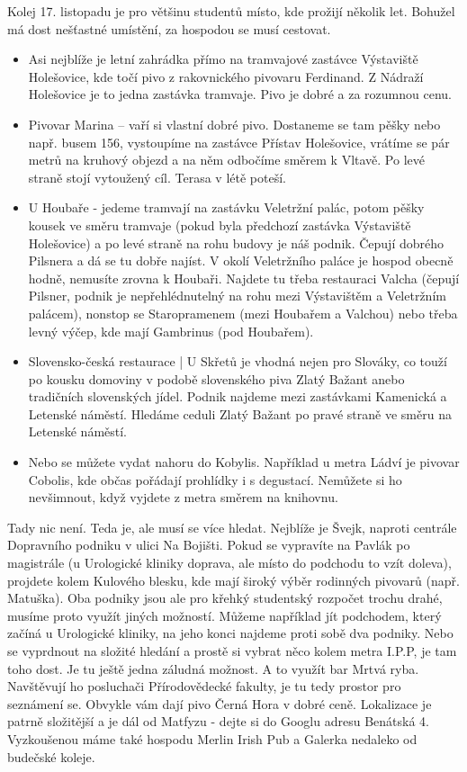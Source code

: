Kolej 17. listopadu je pro většinu studentů místo, kde prožijí několik let.
Bohužel má dost nešťastné umístění, za hospodou se musí cestovat.
\begin{itemize}
\item Asi nejblíže je letní zahrádka přímo na tramvajové zastávce Výstaviště
Holešovice, kde točí pivo z rakovnického pivovaru Ferdinand. Z Nádraží
Holešovice je to jedna zastávka tramvaje. Pivo je dobré a za rozumnou cenu.
\item Pivovar Marina – vaří si vlastní dobré pivo. Dostaneme se tam pěšky nebo
např. busem 156, vystoupíme na zastávce Přístav Holešovice, vrátíme se pár metrů
na kruhový objezd a na něm odbočíme směrem k Vltavě. Po levé straně stojí
vytoužený cíl. Terasa v létě poteší.
\item U Houbaře - jedeme tramvají na zastávku Veletržní palác, potom pěšky
kousek ve směru tramvaje (pokud byla předchozí zastávka Výstaviště Holešovice) a
po levé straně na rohu budovy je náš podnik. Čepují dobrého Pilsnera a dá se tu
dobře najíst. V okolí Veletržního paláce je hospod obecně hodně, nemusíte zrovna
k Houbaři. Najdete tu třeba restauraci Valcha (čepují Pilsner, podnik je
nepřehlédnutelný na rohu mezi Výstavištěm a Veletržním palácem), nonstop se
Staropramenem (mezi Houbařem a Valchou) nebo třeba levný výčep, kde mají
Gambrinus (pod Houbařem).
\item Slovensko-česká restaurace | U Skřetů je vhodná nejen pro Slováky, co
touží po kousku domoviny v podobě slovenského piva Zlatý Bažant anebo tradičních
slovenských jídel. Podnik najdeme mezi zastávkami Kamenická a Letenské náměstí.
Hledáme ceduli Zlatý Bažant po pravé straně ve směru na Letenské náměstí.
\item Nebo se můžete vydat nahoru do Kobylis. Například u metra Ládví je pivovar
Cobolis, kde občas pořádají prohlídky i s degustací. Nemůžete si ho nevšimnout,
když vyjdete z metra směrem na knihovnu.
\end{itemize}

Tady nic není. Teda je, ale musí se více hledat. Nejblíže je Švejk, naproti
centrále Dopravního podniku v ulici Na Bojišti. Pokud se vypravíte na Pavlák po
magistrále (u Urologické kliniky doprava, ale místo do podchodu to vzít doleva),
projdete kolem Kulového blesku, kde mají široký výběr rodinných pivovarů (např.
Matuška). Oba podniky jsou ale pro křehký studentský rozpočet trochu drahé,
musíme proto využít jiných možností. Můžeme například jít podchodem, který
začíná u Urologické kliniky, na jeho konci najdeme proti sobě dva podniky. Nebo
se vyprdnout na složité hledání a prostě si vybrat něco kolem metra I.P.P, je
tam toho dost. Je tu ještě jedna záludná možnost. A to využít bar Mrtvá ryba.
Navštěvují ho posluchači Přírodovědecké fakulty, je tu tedy prostor pro
seznámení se. Obvykle vám dají pivo Černá Hora v dobré ceně. Lokalizace je
patrně složitější a je dál od Matfyzu - dejte si do Googlu adresu Benátská 4.
Vyzkoušenou máme také hospodu Merlin Irish Pub a Galerka nedaleko od budečské
koleje.

